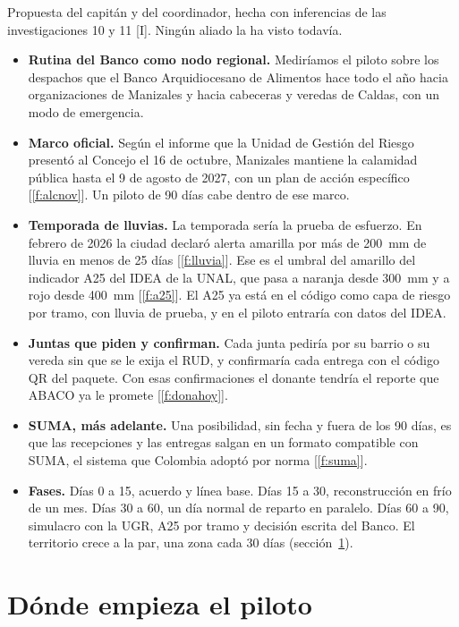\documentclass[11pt,letterpaper,parskip=half-]{scrartcl}
\newcommand{\marca}[1]{\textcolor{ceniza}{\footnotesize[#1]}}   %
\newcommand{\cf}[1]{\textcolor{tinta}{[\ref{#1}]}}                %
\begin{document}
\begin{propuesta}
Propuesta del capitán y del coordinador, hecha con inferencias de las investigaciones 10 y 11 \marca{I}. Ningún aliado la ha visto todavía.
\begin{itemize}[leftmargin=1.2em]
\item \textbf{Rutina del Banco como nodo regional.} Mediríamos el piloto sobre los despachos que el Banco Arquidiocesano de Alimentos hace todo el año hacia organizaciones de Manizales y hacia cabeceras y veredas de Caldas, con un modo de emergencia.
\item \textbf{Marco oficial.} Según el informe que la Unidad de Gestión del Riesgo presentó al Concejo el 16 de octubre, Manizales mantiene la calamidad pública hasta el 9 de agosto de 2027, con un plan de acción específico \cf{f:alcnov}. Un piloto de 90 días cabe dentro de ese marco.
\item \textbf{Temporada de lluvias.} La temporada sería la prueba de esfuerzo. En febrero de 2026 la ciudad declaró alerta amarilla por más de 200~mm de lluvia en menos de 25 días \cf{f:lluvia}. Ese es el umbral del amarillo del indicador A25 del IDEA de la UNAL, que pasa a naranja desde 300~mm y a rojo desde 400~mm \cf{f:a25}. El A25 ya está en el código como capa de riesgo por tramo, con lluvia de prueba, y en el piloto entraría con datos del IDEA.
\item \textbf{Juntas que piden y confirman.} Cada junta pediría por su barrio o su vereda sin que se le exija el RUD, y confirmaría cada entrega con el código QR del paquete. Con esas confirmaciones el donante tendría el reporte que ABACO ya le promete \cf{f:donahoy}.
\item \textbf{SUMA, más adelante.} Una posibilidad, sin fecha y fuera de los 90 días, es que las recepciones y las entregas salgan en un formato compatible con SUMA, el sistema que Colombia adoptó por norma \cf{f:suma}.
\item \textbf{Fases.} Días 0 a 15, acuerdo y línea base. Días 15 a 30, reconstrucción en frío de un mes. Días 30 a 60, un día normal de reparto en paralelo. Días 60 a 90, simulacro con la UGR, A25 por tramo y decisión escrita del Banco. El territorio crece a la par, una zona cada 30 días (sección~\ref{sec:zona}).
\end{itemize}
\end{propuesta}

\section{Dónde empieza el piloto}\label{sec:zona}
\end{document}
